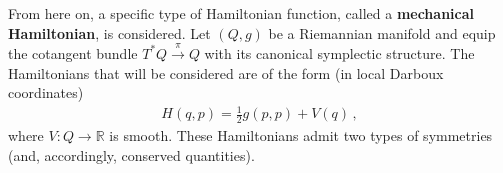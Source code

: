     From here on, a specific type of Hamiltonian function, called a \textbf{mechanical Hamiltonian}, is considered. Let $(Q,g)$ be a Riemannian manifold and equip the cotangent bundle $T^*Q\overset{\pi}{\rightarrow}Q$ with its canonical symplectic structure. The Hamiltonians that will be considered are of the form (in local Darboux coordinates)
    \begin{gather}
        H(q,p) = \frac{1}{2}g(p,p) + V(q)\,,
    \end{gather}
    where $V:Q\rightarrow\mathbb{R}$ is smooth. These Hamiltonians admit two types of symmetries (and, accordingly, conserved quantities).

